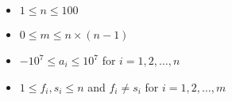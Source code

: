 \begin{itemize}
\tightlist
\item $1 \leq n \leq 100$
\item $0 \leq m \leq n \times (n - 1)$
\item $-10^7 \leq a_i \leq 10^7$ for $i = 1, 2, \ldots, n$
\item $1 \leq f_i, s_i \leq n$ and $f_i \neq s_i$ for $i = 1, 2, \ldots, m$
\end{itemize}
